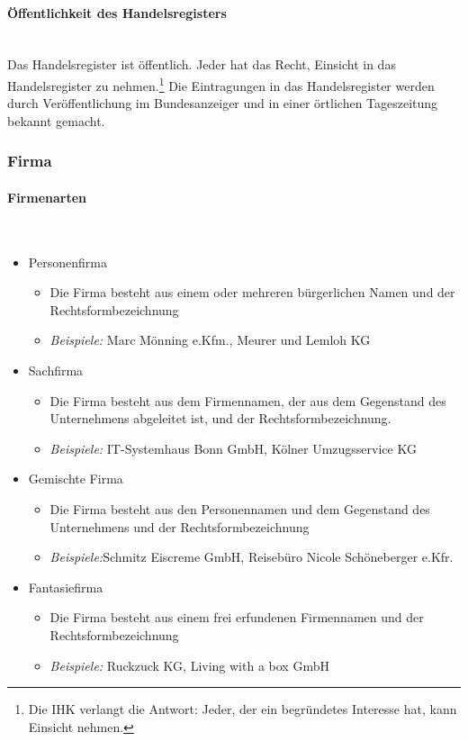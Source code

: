 \paragraph{Öffentlichkeit des Handelsregisters}~\\
Das Handelsregister ist öffentlich. Jeder hat das Recht, Einsicht in das Handelsregister zu nehmen.\footnote{Die IHK verlangt die Antwort: \ql Jeder, der ein begründetes Interesse hat, kann Einsicht nehmen.\qr} Die Eintragungen in das Handelsregister werden durch Veröffentlichung im Bundesanzeiger und in einer örtlichen Tageszeitung bekannt gemacht.

\subsubsection{Firma}

\paragraph{Firmenarten}~\\
\begin{itemize}
	\item Personenfirma
	\begin{itemize}
		\item Die Firma besteht aus einem oder mehreren bürgerlichen Namen und der Rechtsformbezeichnung
		\item  {\it Beispiele:} Marc Mönning e.Kfm., Meurer und Lemloh KG
	\end{itemize}
	\item Sachfirma
	\begin{itemize}
		\item Die Firma besteht aus dem Firmennamen, der aus dem Gegenstand des Unternehmens abgeleitet ist, und der Rechtsformbezeichnung.
		\item  {\it Beispiele:} IT-Systemhaus Bonn GmbH, Kölner Umzugsservice KG
	\end{itemize}
	\item Gemischte Firma
	\begin{itemize}
		\item Die Firma besteht aus den Personennamen und dem Gegenstand des Unternehmens und der Rechtsformbezeichnung
		\item  {\it Beispiele:}Schmitz Eiscreme GmbH, Reisebüro Nicole Schöneberger e.Kfr.
	\end{itemize}
	\item Fantasiefirma
	\begin{itemize}
		\item Die Firma besteht aus einem frei erfundenen Firmennamen und der Rechtsformbezeichnung
		\item  {\it Beispiele:} Ruckzuck KG, Living with a box GmbH
	\end{itemize}
\end{itemize}


